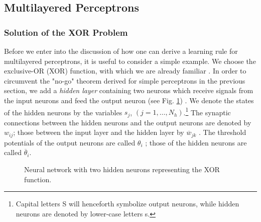 \subsection{Multilayered Perceptrons}\label{sec:Multilayerperceptron}
\subsubsection{Solution of the XOR Problem}\label{sec:XORSolution}
Before we enter into the discussion of how one can derive a learning rule for multilayered perceptrons, it is useful to consider a simple example. We choose the exclusive-OR (XOR) function, with which we are already familiar . In order to circumvent the "no-go" theorem derived for simple perceptrons in the previous section, we add a \emph{hidden layer} containing two neurons which receive signals from the input neurons and feed the output neuron (see Fig. \ref{img:MultilayeredXOR}) . We denote the states of the hidden neurons by the variables $s_j$, $(j = 1, \dots , N_{h})$.\footnote{ Capital letters S will henceforth symbolize output neurons, while hidden neurons are denoted by lower-case letters s.} The synaptic connections between the hidden neurons and the output neurons are denoted by $w_{ij}$; those between the input layer and the hidden layer by $\overline{w}_{jk}$ . The threshold potentials of the output neurons are called $\theta_{i}$ ; those of the hidden neurons are called $\overline{\theta}_{i}$.

\begin{figure}[h!t]
\centering
{}
\caption{Neural network with two hidden neurons representing the XOR function.}\label{img:MultilayeredXOR}
\end{figure}


